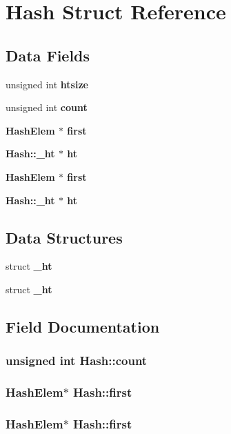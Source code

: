 \section{Hash Struct Reference}
\label{structHash}
\subsection*{Data Fields}
\begin{CompactItemize}
\item 
unsigned int \bf{htsize}
\item 
unsigned int \bf{count}
\item 
\bf{Hash\-Elem} $\ast$ \bf{first}
\item 
\bf{Hash::\_\-ht} $\ast$ \bf{ht}
\item 
\bf{Hash\-Elem} $\ast$ \bf{first}
\item 
\bf{Hash::\_\-ht} $\ast$ \bf{ht}
\end{CompactItemize}
\subsection*{Data Structures}
\begin{CompactItemize}
\item 
struct \bf{\_\-ht}
\item 
struct \bf{\_\-ht}
\end{CompactItemize}


\subsection{Field Documentation}
\subsubsection{\setlength{\rightskip}{0pt plus 5cm}unsigned int \bf{Hash::count}}\label{structHash_105c7ed38e6f5652961b63fd87f3637c}


\subsubsection{\setlength{\rightskip}{0pt plus 5cm}\bf{Hash\-Elem}$\ast$ \bf{Hash::first}}\label{structHash_f3ea6125dfc7fee9d5920a332c39a2cb}


\subsubsection{\setlength{\rightskip}{0pt plus 5cm}\bf{Hash\-Elem}$\ast$ \bf{Hash::first}}\label{structHash_f3ea6125dfc7fee9d5920a332c39a2cb}


